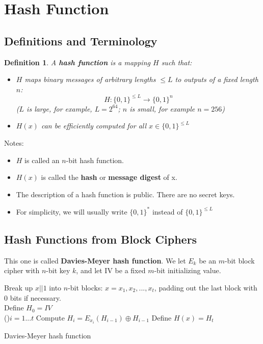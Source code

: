 \documentclass[12pt,titlepage]{article}
\newtheorem{protodefinition}[prototheorem]{Definition}
\newenvironment{definition}
{\colorlet{shadecolor}{cyan!15}\begin{shaded}\begin{protodefinition}\normalfont}{\end{protodefinition}\end{shaded}}
\let\stdsection\section
\renewcommand\section{\clearpage\stdsection}
\begin{document}
\section{Hash Function}
\subsection{Definitions and Terminology}
\begin{definition}
	A \textbf{hash function} is a mapping $H$ such that:\begin{itemize}
	\item $H$ maps binary messages of arbitrary lengths $\leq L$ to outputs of a fixed length $n$:$$H: \{0, 1\}^{\leq L} \rightarrow \{0, 1\}^n$$
	($L$ is large, for example, $L = 2^{64}$; $n$ is small, for example $n = 256$)
	\item $H(x)$ can be efficiently computed for all $x \in \{0, 1\}^{\leq L}$
	\end{itemize}
\end{definition}
Notes: \begin{itemize}
\item $H$ is called an $n$-bit hash function.
\item $H(x)$ is called the \textbf{hash} or \textbf{message digest} of x.
\item The description of a hash function is public. There are no secret keys.
\item For simplicity, we will usually write $\{0, 1\}^*$ instead of $\{0, 1\}^{\leq L}$
\end{itemize}

\subsection{Hash Functions from Block Ciphers}
This one is called \textbf{Davies-Meyer hash function}. We let $E_k$ be an $m$-bit block cipher with $n$-bit key $k$, and let IV be a fixed $m$-bit initializing value.

\begin{algorithm}
	Break up $x||1$ into $n$-bit blocks: $x = x_1, x_2 ,..., x_t$, padding out the last block with 0 bits if necessary.\\
	Define $H_0 = IV$\\
	\For(){$i = 1...t$}{
		Compute $H_i = E_{x_i} (H_{i-1}) \oplus H_{i-1}$
	}
	Define $H(x) = H_t$
	\caption{Davies-Meyer hash function}
\end{algorithm}
\end{document}
